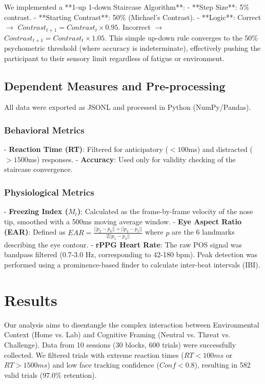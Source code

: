 \documentclass[journal]{IEEEtran}
\begin{document}
We implemented a **1-up 1-down Staircase Algorithm**:
- **Step Size**: 5\% contrast.
- **Starting Contrast**: 50\% (Michael's Contrast).
- **Logic**: Correct $\to$ $Contrast_{t+1} = Contrast_t \times 0.95$. Incorrect $\to$ $Contrast_{t+1} = Contrast_t \times 1.05$.
This simple up-down rule converges to the 50\% psychometric threshold (where accuracy is indeterminate),
effectively pushing the participant to their sensory limit regardless of fatigue or environment.

\subsection{Dependent Measures and Pre-processing}
All data were exported as JSONL and processed in Python (NumPy/Pandas).

\subsubsection{Behavioral Metrics}
- \textbf{Reaction Time (RT)}: Filtered for anticipatory ($<100$ms) and distracted ($>1500$ms) responses.
- \textbf{Accuracy}: Used only for validity checking of the staircase convergence.

\subsubsection{Physiological Metrics}
- \textbf{Freezing Index ($M_t$)}: Calculated as the frame-by-frame velocity of the nose tip, smoothed with a 500ms moving average window.
- \textbf{Eye Aspect Ratio (EAR)}: Defined as $EAR = \frac{||p_2 - p_6|| + ||p_3 - p_5||}{2||p_1 - p_4||}$ where $p$ are the 6 landmarks describing the eye contour.
- \textbf{rPPG Heart Rate}: The raw POS signal was bandpass filtered (0.7-3.0 Hz, corresponding to 42-180 bpm). 
Peak detection was performed using a prominence-based finder to calculate inter-beat intervals (IBI).

\section{Results}

Our analysis aims to disentangle the complex interaction between Environmental Context (Home vs. Lab) and Cognitive Framing (Neutral vs. Threat vs. Challenge).
Data from 10 sessions (30 blocks, 600 trials) were successfully collected.
We filtered trials with extreme reaction times ($RT < 100ms$ or $RT > 1500ms$) and low face tracking confidence ($Conf < 0.8$), resulting in 582 valid trials (97.0\% retention).
\end{document}
